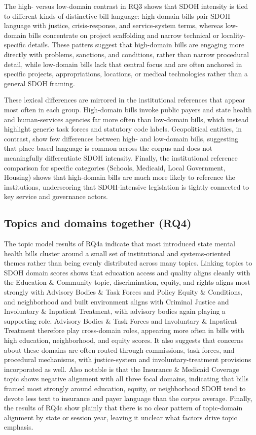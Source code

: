 \documentclass[10pt,twocolumn]{article}
\begin{document}
The high- versus low-domain contrast in RQ3 shows that SDOH intensity is
tied to different kinds of distinctive bill language: high-domain bills
pair SDOH language with justice, crisis-response, and service-system
terms, whereas low-domain bills concentrate on project scaffolding and
narrow technical or locality-specific details. These patters suggest
that high-domain bills are engaging more directly with problems,
sanctions, and conditions, rather than narrow procedural detail, while
low-domain bills lack that central focus and are often anchored in
specific projects, appropriations, locations, or medical technologies
rather than a general SDOH framing.

These lexical differences are mirrored in the institutional references
that appear most often in each group. High-domain bills invoke public
payers and state health and human-services agencies far more often than
low-domain bills, which instead highlight generic task forces and
statutory code labels. Geopolitical entities, in contrast, show few
differences between high- and low-domain bills, suggesting that
place-based language is common across the corpus and does not
meaningfully differentiate SDOH intensity. Finally, the institutional
reference comparison for specific categories (Schools, Medicaid, Local
Government, Housing) shows that high-domain bills are much more likely
to reference the institutions, underscoring that SDOH-intensive
legislation is tightly connected to key service and governance actors.

\subsection{Topics and domains together
(RQ4)}\label{topics-and-domains-together-rq4}

The topic model results of RQ4a indicate that most introduced state
mental health bills cluster around a small set of institutional and
systems-oriented themes rather than being evenly distributed across many
topics. Linking topics to SDOH domain scores shows that education access
and quality aligns cleanly with the Education \& Community topic,
discrimination, equity, and rights aligns most strongly with Advisory
Bodies \& Task Forces and Policy Equity \& Conditions, and neighborhood
and built environment aligns with Criminal Justice and Involuntary \&
Inpatient Treatment, with advisory bodies again playing a supporting
role. Advisory Bodies \& Task Forces and Involuntary \& Inpatient
Treatment therefore play cross-domain roles, appearing more often in
bills with high education, neighborhood, and equity scores. It also
suggests that concerns about these domains are often routed through
commissions, task forces, and procedural mechanisms, with justice-system
and involuntary-treatment provisions incorporated as well. Also notable
is that the Insurance \& Medicaid Coverage topic shows negative
alignment with all three focal domains, indicating that bills framed
most strongly around education, equity, or neighborhood SDOH tend to
devote less text to insurance and payer language than the corpus
average. Finally, the results of RQ4c show plainly that there is no
clear pattern of topic-domain alignment by state or session year,
leaving it unclear what factors drive topic emphasis.
\end{document}
